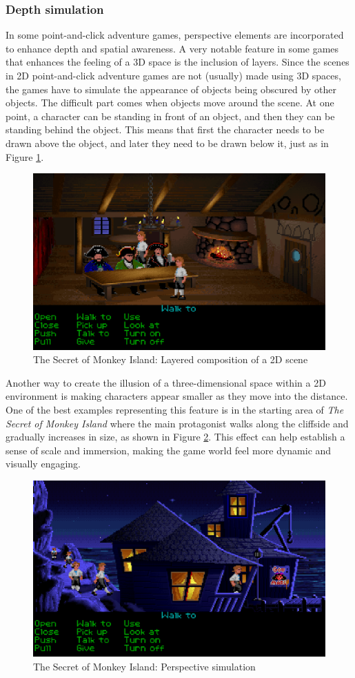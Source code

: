 \subsubsection{Depth simulation}
In some point-and-click adventure games, perspective elements are incorporated to enhance depth and spatial awareness. 
A very notable feature in some games that enhances the feeling of a 3D space is the inclusion of layers. Since the scenes in 2D point-and-click adventure games are not (usually) made using 3D spaces, the games have to simulate the appearance of objects being obscured by other objects. The difficult part comes when objects move around the scene. At one point, a character can be standing in front of an object, and then they can be standing behind the object. This means that first the character needs to be drawn above the object, and later they need to be drawn below it, just as in Figure \ref{fig:M-TSoMI0}.

\begin{figure}[H]
\centering
\includegraphics[width=.8\linewidth]{img/M-TSoMI0.png}
\caption{The Secret of Monkey Island: Layered composition of a 2D scene}
\label{fig:M-TSoMI0}
\end{figure}

Another way to create the illusion of a three-dimensional space within a 2D environment is making characters appear smaller as they move into the distance. One of the best examples representing this feature is in the starting area of \textit{The Secret of Monkey Island} where the main protagonist walks along the cliffside and gradually increases in size, as shown in Figure \ref{fig:M-TSoMI}. This effect can help establish a sense of scale and immersion, making the game world feel more dynamic and visually engaging. 

\begin{figure}[H]
\centering
\includegraphics[width=.8\linewidth]{img/M-TSoMI.png}
\caption{The Secret of Monkey Island: Perspective simulation}
\label{fig:M-TSoMI}
\end{figure}

